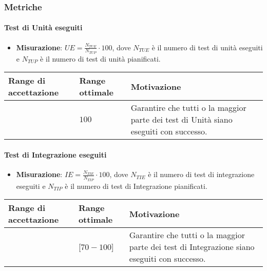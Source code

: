 \subsubsection{Metriche}

\paragraph{Test di Unità eseguiti}

\begin{itemize}
\item \textbf{Misurazione}: $UE=\frac{N_{TUE}}{N_{TUP}} \cdot 100$, dove $N_{TUE}$ è il numero di test di unità eseguiti e $N_{TUP}$ è il numero di test di unità pianificati.
\end{itemize}

\begin{center}
		\begin{tabular}{|P{2.5cm}|P{2.5cm}|P{6cm}|}
		\hline
			\textbf{Range di accettazione}	& \textbf{Range ottimale} & \textbf{Motivazione} \\
			\hline
			[$90 - 100$] & $100$ &	Garantire che tutti o la maggior parte dei test di Unità siano eseguiti con successo. \\
			\hline
			\end{tabular}
\end{center}


\paragraph{Test di Integrazione eseguiti}

\begin{itemize}
\item \textbf{Misurazione}: $IE=\frac{N_{TIE}}{N_{TIP}} \cdot 100$, dove $N_{TIE}$ è il numero di test di integrazione eseguiti e $N_{TIP}$ è il numero di test di Integrazione pianificati.
\end{itemize}

\begin{center}
		\begin{tabular}{|P{2.5cm}|P{2.5cm}|P{6cm}|}
		\hline
			\textbf{Range di accettazione}	& \textbf{Range ottimale} & \textbf{Motivazione} \\
			\hline
			[$60 - 100$] & [$70 - 100$] &	Garantire che tutti o la maggior parte dei test di Integrazione siano eseguiti con successo. \\
			\hline
			\end{tabular}
\end{center}


